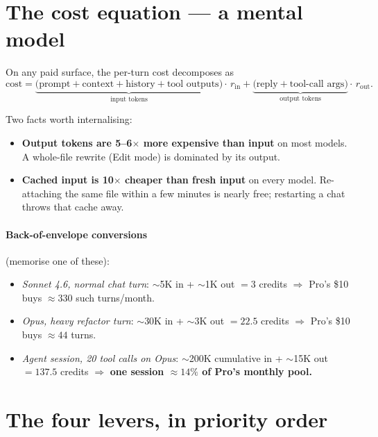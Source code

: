 \documentclass[11pt,a4paper]{article}
\begin{document}
\section{The cost equation --- a mental model}\label{sec:equation}

On any paid surface, the per-turn cost decomposes as
\[
\text{cost}
= \underbrace{\bigl(\text{prompt} + \text{context} + \text{history} + \text{tool outputs}\bigr)}_{\text{input tokens}} \cdot\, r_{\text{in}}
+ \underbrace{\bigl(\text{reply} + \text{tool-call args}\bigr)}_{\text{output tokens}} \cdot\, r_{\text{out}}.
\]

Two facts worth internalising:

\begin{itemize}
  \item \textbf{Output tokens are 5--6$\times$ more expensive than input} on most models. A whole-file rewrite (Edit mode) is dominated by its output.
  \item \textbf{Cached input is 10$\times$ cheaper than fresh input} on every model. Re-attaching the same file within a few minutes is nearly free; restarting a chat throws that cache away.
\end{itemize}

\paragraph{Back-of-envelope conversions} (memorise one of these):

\begin{itemize}
  \item \emph{Sonnet 4.6, normal chat turn}: $\sim$5K in + $\sim$1K out $= 3$ credits $\Rightarrow$ Pro's \$10 buys $\approx 330$ such turns/month.
  \item \emph{Opus, heavy refactor turn}: $\sim$30K in + $\sim$3K out $= 22.5$ credits $\Rightarrow$ Pro's \$10 buys $\approx 44$ turns.
  \item \emph{Agent session, 20 tool calls on Opus}: $\sim$200K cumulative in + $\sim$15K out $= 137.5$ credits $\Rightarrow$ \textbf{one session $\approx 14\%$ of Pro's monthly pool.}
\end{itemize}

\section{The four levers, in priority order}\label{sec:levers}
\end{document}
